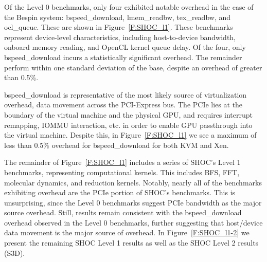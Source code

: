 Of the Level 0 benchmarks, only four exhibited notable
overhead in the case of the Bespin system: bspeed\_download, lmem\_readbw, tex\_readbw, and ocl\_queue.  These are
shown in Figure~\ref{F:SHOC_l1}.  These benchmarks represent device-level
characteristics, including host-to-device bandwidth, onboard memory reading, and OpenCL
kernel queue delay.  Of the four, only bspeed\_download incurs a statistically
significant overhead.  The remainder perform within one standard deviation of
the base, despite an overhead of greater than 0.5\%.  

bspeed\_download is representative of the most likely source of virtualization overhead, data
movement across the PCI-Express bus.  The PCIe lies at the boundary of
the virtual machine and the physical GPU, and requires interrupt remapping,
IOMMU interaction, etc. in order to enable GPU passthrough into the virtual
machine.  Despite this, in Figure~\ref{F:SHOC_l1} we see a maximum of less than 0.5\% overhead for bspeed\_download for both KVM and Xen.

The remainder of Figure~\ref{F:SHOC_l1} includes a series of SHOC's Level 1
benchmarks, representing computational kernels.  This includes BFS, FFT, molecular dynamics,
and reduction kernels.  Notably, nearly all of the benchmarks exhibiting
overhead are the PCIe portion of SHOC's benchmarks. This is unsurprising, since
the Level 0 benchmarks suggest PCIe bandwidth as the major source overhead.
Still, results remain consistent with the bspeed\_download overhead observed in
the Level 0 benchmarks, further suggesting that host/device data movement
is the major source of overhead.  In Figure~\ref{F:SHOC_l1-2} we present the remaining SHOC Level 1 results as well
as the SHOC Level 2 results (S3D).  




